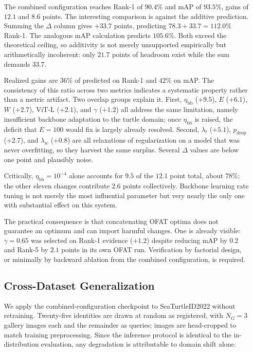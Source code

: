 \documentclass[conference]{IEEEtran}
\begin{document}
The combined configuration reaches Rank-1 of $90.4\%$ and mAP of $93.5\%$, gains of
$12.1$ and $8.6$ points. The interesting comparison is against the additive prediction.
Summing the $\Delta$ column gives $+33.7$ points, predicting $78.3 + 33.7 = 112.0\%$
Rank-1. The analogous mAP calculation predicts $105.6\%$. Both exceed the theoretical
ceiling, so additivity is not merely unsupported empirically but arithmetically
incoherent: only $21.7$ points of headroom exist while the sum demands $33.7$.

Realized gains are $36\%$ of predicted on Rank-1 and $42\%$ on mAP. The consistency of
this ratio across two metrics indicates a systematic property rather than a metric
artifact. Two overlap groups explain it. First, $\eta_{\text{bb}}$ ($+9.5$), $E$
($+6.1$), $W$ ($+2.7$), ViT-L ($+2.1$), and $\gamma$ ($+1.2$) all address the same
limitation, namely insufficient backbone adaptation to the turtle domain; once
$\eta_{\text{bb}}$ is raised, the deficit that $E=100$ would fix is largely already
resolved. Second, $\lambda_t$ ($+5.1$), $p_{\text{drop}}$ ($+2.7$), and $\lambda_w$
($+0.8$) are all relaxations of regularization on a model that was never overfitting,
so they harvest the same surplus. Several $\Delta$ values are below one point and
plausibly noise.

Critically, $\eta_{\text{bb}}=10^{-4}$ alone accounts for $9.5$ of the $12.1$ point
total, about $78\%$; the other eleven changes contribute $2.6$ points collectively.
Backbone learning rate tuning is not merely the most influential parameter but very
nearly the only one with substantial effect on this system.

The practical consequence is that concatenating OFAT optima does not guarantee an
optimum and can import harmful changes. One is already visible: $\gamma = 0.65$ was
selected on Rank-1 evidence ($+1.2$) despite reducing mAP by $0.2$ and Rank-5 by $2.1$
points in its own OFAT run. Verification by factorial design, or minimally by backward
ablation from the combined configuration, is required.

\subsection{Cross-Dataset Generalization}

We apply the combined-configuration checkpoint to SeaTurtleID2022 \cite{adam2023}
without retraining. Twenty-five identities are drawn at random as registered, with
$N_G=3$ gallery images each and the remainder as queries; images are head-cropped to
match training preprocessing. Since the inference protocol is identical to the
in-distribution evaluation, any degradation is attributable to domain shift alone.
\end{document}
